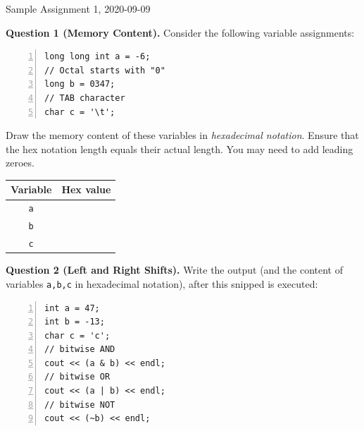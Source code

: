 \documentclass[11pt]{article}
\begin{document}
\thispagestyle{empty}

\twocolumn


\begin{center}
{\Large Sample Assignment 1, 2020-09-09}
\end{center}



\vspace{10pt}
{\bf Question 1 (Memory Content).} Consider the following variable assignments:

\begin{center}
\begin{minipage}{.85\columnwidth}
\begin{Verbatim}[frame=single,numbers=left]
long long int a = -6;  
// Octal starts with "0"
long b = 0347;  
// TAB character
char c = '\t';  
\end{Verbatim}
\end{minipage}
\end{center}

Draw the memory content of these variables in {\em hexadecimal notation}. Ensure that the hex notation
length equals their actual length. You may need to add leading zeroes.

{\footnotesize
\begin{tabular}{|c|c|} \hline
{\bf Variable} & {\bf Hex value} \\ \hline
{\tt a} & \mbox{}\hspace{150pt}\mbox{} \\[10pt] \hline
{\tt b} & \\[10pt] \hline
{\tt c} & \\[10pt] \hline
\end{tabular}
}

\vspace{20pt}
{\bf Question 2 (Left and Right Shifts).} Write the output
(and the content of variables {\tt a,b,c} in hexadecimal notation),
after this snipped is executed:

\begin{center}
\begin{minipage}{.85\columnwidth}
\begin{Verbatim}[frame=single,numbers=left]
int a = 47;
int b = -13;
char c = 'c';
// bitwise AND
cout << (a & b) << endl;
// bitwise OR  
cout << (a | b) << endl;
// bitwise NOT
cout << (~b) << endl;
\end{Verbatim}
\end{minipage}
\end{center}
\end{document}
